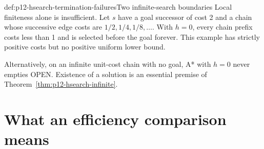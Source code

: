 \begin{hbexample}{def:p12-hsearch-termination-failures}{Two infinite-search boundaries}
Local finiteness alone is insufficient. Let \(s\) have a goal successor
of cost 2 and a chain whose successive edge costs are
\(1/2,1/4,1/8,\ldots\). With \(h=0\), every chain prefix costs less
than 1 and is selected before the goal forever. This example has strictly
positive costs but no positive uniform lower bound.

Alternatively, on an infinite unit-cost chain with no goal, A* with
\(h=0\) never empties OPEN. Existence of a solution is an essential
premise of Theorem~\ref{thm:p12-hsearch-infinite}.
\end{hbexample}

\section{What an efficiency comparison means}

